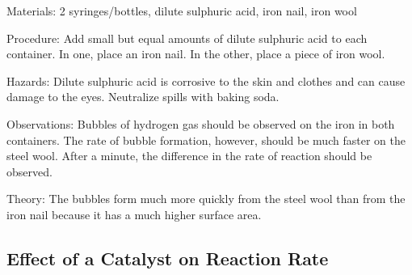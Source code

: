 \begin{multicols}{2}
\begin{description*}
\item[Materials:]{2 syringes/bottles, dilute sulphuric acid, iron nail, iron wool}
\item[Procedure:]{Add small but equal amounts of dilute sulphuric acid to each container. In one, place an iron nail. In the other, place a piece of iron wool.}
\item[Hazards:]{Dilute sulphuric acid is corrosive to the skin and clothes and can cause
damage to the eyes. Neutralize spills with baking soda.}
\item[Observations:]{Bubbles of hydrogen gas should be observed on the
iron in both containers. The rate of bubble formation, however, should be much faster on
the steel wool. After a minute, the difference in the rate of reaction
should be observed.}
\item[Theory:]{The bubbles form much more quickly from the steel
wool than from the iron nail because it has a much higher surface area.}
\end{description*}

\subsection{Effect of a Catalyst on Reaction Rate}



\end{multicols}
